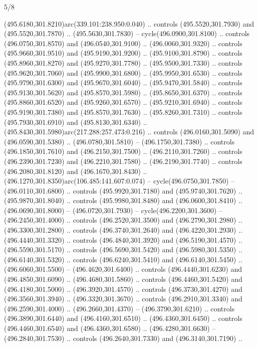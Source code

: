 \begin{flagdescription}{5/8}
\begin{scope}[xshift=0.5\flaglength,yshift=0.5\flagwidth,scale=\flagwidth/475.63]
\begin{scope}[y=0.8pt, x=0.8pt, yscale=-1, xscale=1,shift={(-450,-300)}]
\begin{scope}[cm={{1.0,0.0,0.0,1.0,(-0.0002,0.12556)}},cm={{1.0,0.0,0.0,1.0,(0.00179,0.0)}}]
\begin{scope}[cm={{1.11592,0.0,0.0,1.11592,(-106.89933,-41.77764)}}]
\begin{scope}[draw=black,fill=cfff]
\begin{scope}[fill=black]
  (495.6180,301.8210)arc(339.101:238.950:0.040) .. controls (495.5520,301.7930)
  and (495.5520,301.7870) .. (495.5630,301.7830) -- cycle(496.0900,301.8100) ..
  controls (496.0750,301.8570) and (496.0540,301.9100) .. (496.0060,301.9320) ..
  controls (495.9660,301.9510) and (495.9190,301.9200) .. (495.9100,301.8790) ..
  controls (495.8960,301.8270) and (495.9270,301.7780) .. (495.9500,301.7330) ..
  controls (495.9620,301.7060) and (495.9900,301.6800) .. (495.9950,301.6530) ..
  controls (495.9790,301.6300) and (495.9670,301.6040) .. (495.9470,301.5840) ..
  controls (495.9130,301.5620) and (495.8570,301.5980) .. (495.8650,301.6370) ..
  controls (495.8860,301.6520) and (495.9260,301.6570) .. (495.9210,301.6940) ..
  controls (495.9190,301.7380) and (495.8570,301.7630) .. (495.8260,301.7310) ..
  controls (495.7930,301.6910) and (495.8130,301.6340) ..
  (495.8430,301.5980)arc(217.288:257.473:0.216) .. controls (496.0160,301.5090)
  and (496.0590,301.5380) .. (496.0780,301.5810) -- (496.1750,301.7380) ..
  controls (496.1850,301.7610) and (496.2150,301.7500) .. (496.2110,301.7260) ..
  controls (496.2390,301.7230) and (496.2210,301.7580) .. (496.2190,301.7740) ..
  controls (496.2080,301.8120) and (496.1670,301.8430) ..
  (496.1270,301.8350)arc(106.485:141.607:0.074) -- cycle(496.0750,301.7850) --
  (496.0110,301.6800) .. controls (495.9920,301.7180) and (495.9740,301.7620) ..
  (495.9870,301.8040) .. controls (495.9980,301.8480) and (496.0600,301.8410) ..
  (496.0690,301.8000) -- (496.0720,301.7930) -- cycle(496.2200,301.3600) --
  (496.2450,301.4000) .. controls (496.2520,301.3500) and (496.2790,301.2980) ..
  (496.3300,301.2800) .. controls (496.3740,301.2640) and (496.4220,301.2930) ..
  (496.4440,301.3320) .. controls (496.4840,301.3920) and (496.5190,301.4570) ..
  (496.5590,301.5170) .. controls (496.5690,301.5420) and (496.5980,301.5350) ..
  (496.6140,301.5320) .. controls (496.6240,301.5410) and (496.6140,301.5450) ..
  (496.6060,301.5500) -- (496.4620,301.6400) .. controls (496.4440,301.6230) and
  (496.4850,301.6090) .. (496.4680,301.5860) .. controls (496.4460,301.5420) and
  (496.4180,301.5000) .. (496.3920,301.4570) .. controls (496.3730,301.4270) and
  (496.3560,301.3940) .. (496.3320,301.3670) .. controls (496.2910,301.3340) and
  (496.2590,301.4000) .. (496.2660,301.4370) -- (496.3790,301.6210) .. controls
  (496.3890,301.6440) and (496.4160,301.6510) .. (496.4360,301.6450) .. controls
  (496.4460,301.6540) and (496.4360,301.6580) .. (496.4280,301.6630) --
  (496.2840,301.7530) .. controls (496.2640,301.7330) and (496.3140,301.7190) ..

\end{scope}
\end{scope}
\end{scope}
\end{scope}
\end{scope}
\end{scope}
\end{flagdescription}
